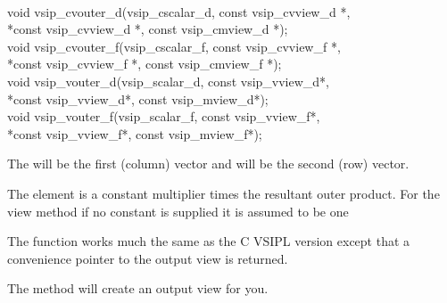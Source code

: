 \\\cvsiplh
\begin{cfuncs}
void vsip\_cvouter\_d(vsip\_cscalar\_d, const vsip\_cvview\_d *,\\*\hspace{.6cm}const vsip\_cvview\_d *, const vsip\_cmview\_d *);\\
void vsip\_cvouter\_f(vsip\_cscalar\_f, const vsip\_cvview\_f *,\\*\hspace{.6cm}const vsip\_cvview\_f *, const vsip\_cmview\_f *);\\
void vsip\_vouter\_d(vsip\_scalar\_d, const vsip\_vview\_d*,\\*\hspace{.6cm}const vsip\_vview\_d*, const vsip\_mview\_d*);\\
void vsip\_vouter\_f(vsip\_scalar\_f, const vsip\_vview\_f*,\\*\hspace{.6cm}const vsip\_vview\_f*, const vsip\_mview\_f*);\\
\end{cfuncs}
\pyjvsiph
{}
\begin{comments}
\item{The  will be the first (column) vector and  will be the second (row) vector.}
\item{The element  is a constant multiplier times the resultant outer product. For the view method if no constant is supplied it is assumed to be one}
\item{The  function works much the same as the C VSIPL version except that a convenience pointer to the output view is returned.}
\item{The  method will create an output view for you.}
\end{comments}